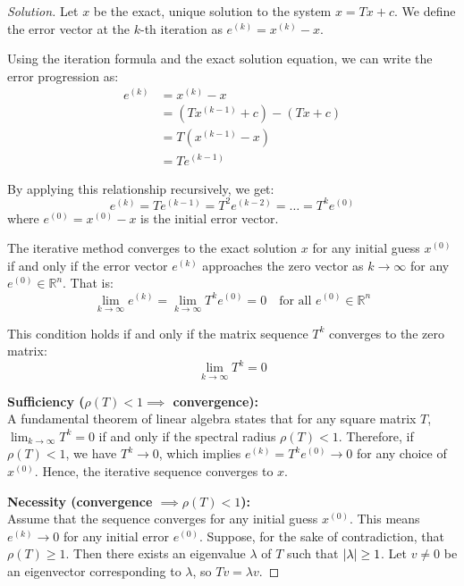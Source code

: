 \documentclass[11pt, a4paper]{article}
\newcommand{\R}{\mathbb{R}}
\DeclarePairedDelimiter\abs{\lvert}{\rvert}
\newif\ifsolutionnewpage
\newenvironment{solution}
  {\begin{proof}[Solution]}
  {\end{proof}\ifsolutionnewpage\newpage\fi}
\begin{document}
\begin{solution}
    Let $x$ be the exact, unique solution to the system $x = Tx + c$. We define the error vector at the $k$-th iteration as $e^{(k)} = x^{(k)} - x$.
    
    Using the iteration formula and the exact solution equation, we can write the error progression as:
    \begin{align*}
        e^{(k)} &= x^{(k)} - x \\
        &= (Tx^{(k-1)} + c) - (Tx + c) \\
        &= T(x^{(k-1)} - x) \\
        &= Te^{(k-1)}
    \end{align*}
    
    By applying this relationship recursively, we get:
    \[
    e^{(k)} = Te^{(k-1)} = T^2e^{(k-2)} = \dots = T^k e^{(0)}
    \]
    where $e^{(0)} = x^{(0)} - x$ is the initial error vector.
    
    The iterative method converges to the exact solution $x$ for any initial guess $x^{(0)}$ if and only if the error vector $e^{(k)}$ approaches the zero vector as $k \to \infty$ for any $e^{(0)} \in \R^n$. That is:
    \[
    \lim_{k \to \infty} e^{(k)} = \lim_{k \to \infty} T^k e^{(0)} = 0 \quad \text{for all } e^{(0)} \in \R^n
    \]
    
    This condition holds if and only if the matrix sequence $T^k$ converges to the zero matrix:
    \[
    \lim_{k \to \infty} T^k = 0
    \]
    
    \vspace{1em}
    \textbf{Sufficiency ($\rho(T) < 1 \implies$ convergence):} \\
    A fundamental theorem of linear algebra states that for any square matrix $T$, $\lim_{k \to \infty} T^k = 0$ if and only if the spectral radius $\rho(T) < 1$. 
    Therefore, if $\rho(T) < 1$, we have $T^k \to 0$, which implies $e^{(k)} = T^k e^{(0)} \to 0$ for any choice of $x^{(0)}$. Hence, the iterative sequence converges to $x$.

    \vspace{1em}
    \textbf{Necessity (convergence $\implies \rho(T) < 1$):} \\
    Assume that the sequence converges for any initial guess $x^{(0)}$. This means $e^{(k)} \to 0$ for any initial error $e^{(0)}$. 
    Suppose, for the sake of contradiction, that $\rho(T) \ge 1$. Then there exists an eigenvalue $\lambda$ of $T$ such that $\abs{\lambda} \ge 1$. Let $v \neq 0$ be an eigenvector corresponding to $\lambda$, so $Tv = \lambda v$.
    

\end{solution}
\end{document}

